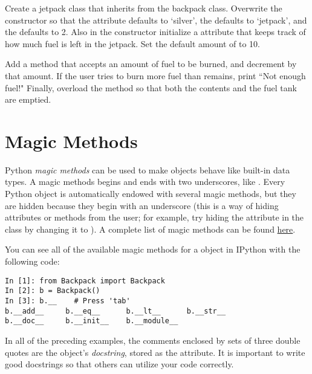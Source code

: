 \begin{problem}
Create a jetpack class that inherits from the backpack class.
Overwrite the constructor so that the  attribute defaults to `silver', the  defaults to `jetpack', and the  defaults to 2.
Also in the constructor initialize a  attribute that keeps track of how much fuel is left in the jetpack.
Set the default amount of  to 10.

Add a  method that accepts an amount of fuel to be burned, and decrement  by that amount.
If the user tries to burn more fuel than remains, print ``Not enough fuel!"
Finally, overload the  method so that both the contents and the fuel tank are emptied.
\end{problem}

\section*{Magic Methods}

Python \emph{magic methods} can be used to make objects behave like built-in data types.
A magic methods begins and ends with two underscores, like .
Every Python object is automatically endowed with several magic methods, but they are hidden because they begin with an underscore (this is a way of hiding attributes or methods from the user; for example, try hiding the  attribute in the  class by changing it to ).
A complete list of magic methods can be found \href{https://docs.python.org/2/reference/datamodel.html#special-method-names}{here}.

You can see all of the available magic methods for a  object in IPython with the following code:

\begin{lstlisting}
In [1]: from Backpack import Backpack
In [2]: b = Backpack()
In [3]: b.__	# Press 'tab'
b.__add__     b.__eq__      b.__lt__      b.__str__     
b.__doc__     b.__init__    b.__module__  
\end{lstlisting}

\begin{info}
In all of the preceding examples, the comments enclosed by sets of three double quotes are the object's \emph{docstring}, stored as the  attribute.
It is important to write good docstrings so that others can utilize your code correctly.
\end{info}

